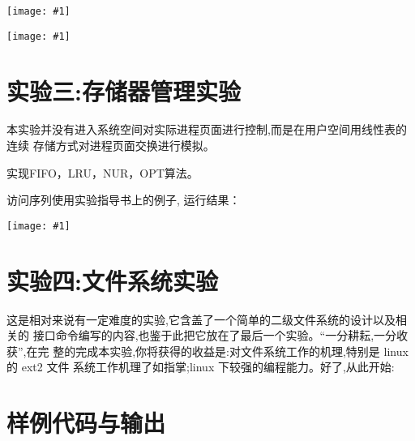\documentclass{article}
\newcommand{\incpng}[1]{\texttt{[image: \#1]}}
\begin{document}
\begin{CJK}{UTF8}{gkai}
\incpng{../ac}



\incpng{../bc}

\section{实验三:存储器管理实验}
本实验并没有进入系统空间对实际进程页面进行控制,而是在用户空间用线性表的连续
存储方式对进程页面交换进行模拟。

实现FIFO，LRU，NUR，OPT算法。



访问序列使用实验指导书上的例子, 运行结果：

\incpng{../page}

\section{实验四:文件系统实验}
这是相对来说有一定难度的实验,它含盖了一个简单的二级文件系统的设计以及相关的
接口命令编写的内容,也鉴于此把它放在了最后一个实验。“一分耕耘,一分收获”,在完
整的完成本实验,你将获得的收益是:对文件系统工作的机理,特别是 linux 的 ext2 文件
系统工作机理了如指掌;linux 下较强的编程能力。好了,从此开始:

%

{\small
	
	
}
\clearpage

\appendix
\section{样例代码与输出}\label{append}


\end{CJK}
\end{document}
